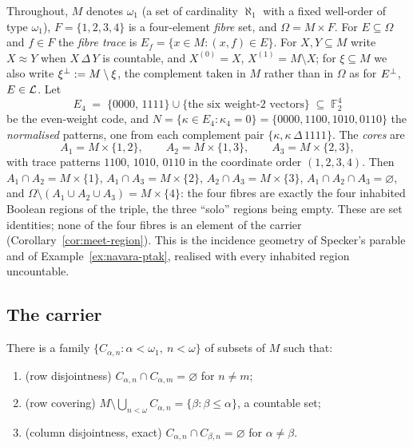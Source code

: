 Throughout, $M$ denotes $\omega_1$ (a set of cardinality $\aleph_1$ with a fixed
well-order of type $\omega_1$), $F=\{1,2,3,4\}$ is a four-element \emph{fibre}
set, and $\Omega = M\times F$. For $E\subseteq\Omega$ and $f\in F$ the
\emph{fibre trace} is $E_f = \{x\in M : (x,f)\in E\}$. For $X,Y\subseteq M$ write
$X\approx Y$ when $X\,\Delta\,Y$ is countable, and $X^{(0)}=X$,
$X^{(1)}=M\setminus X$; for $\xi\subseteq M$ we also write $\xi{}^{\perp} := M\setminus\xi$,
the complement taken in $M$ rather than in $\Omega$ as for $E{}^{\perp}$, $E\in\mathcal{L}$. Let
\[
  E_4 \;=\; \{0000,\,1111\}\cup\{\text{the six weight-2 vectors}\}
  \;\subseteq\;\mathbb F_2^4
\]
be the even-weight code, and $N=\{\kappa\in E_4 : \kappa_4=0\}
= \{0000, 1100, 1010, 0110\}$ the \emph{normalised} patterns, one from each
complement pair $\{\kappa,\kappa\,\Delta\,1111\}$. The \emph{cores} are
\[
  A_1 = M\times\{1,2\},\qquad A_2 = M\times\{1,3\},\qquad A_3 = M\times\{2,3\},
\]
with trace patterns $1100$, $1010$, $0110$ in the coordinate order $(1,2,3,4)$.
Then $A_1\cap A_2 = M\times\{1\}$, $A_1\cap A_3 = M\times\{2\}$,
$A_2\cap A_3 = M\times\{3\}$, $A_1\cap A_2\cap A_3 = \varnothing$, and
$\Omega\setminus(A_1\cup A_2\cup A_3) = M\times\{4\}$: the four fibres are exactly the four
inhabited Boolean regions of the triple, the three ``solo'' regions being empty.
These are set identities; none of the four fibres is an element of the carrier
(Corollary~\ref{cor:meet-region}).
This is the incidence geometry of Specker's parable and of
Example~\ref{ex:navara-ptak}, realised with every inhabited region uncountable.

\subsection{The carrier}

\begin{lemma}\label{lem:ulam}
There is a family $\{C_{\alpha,n} : \alpha<\omega_1,\ n<\omega\}$ of subsets of
$M$ such that:
\begin{enumerate}[label=\textup{(\arabic*)}]
  \item (row disjointness) $C_{\alpha,n}\cap C_{\alpha,m}=\varnothing$ for $n\neq m$;
  \item (row covering) $M\setminus\bigcup_{n<\omega}C_{\alpha,n}
    = \{\beta:\beta\le\alpha\}$, a countable set;
  \item (column disjointness, exact) $C_{\alpha,n}\cap C_{\beta,n}=\varnothing$
    for $\alpha\neq\beta$.
\end{enumerate}
\end{lemma}

